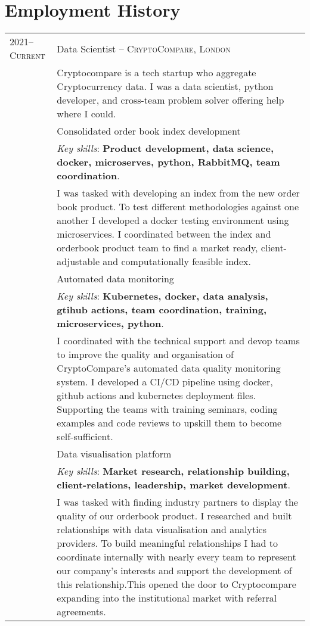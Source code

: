 \documentclass[a4paper,10pt]{article}
\newcommand{\tab}{\hspace{10 pt}}
\begin{document}
\section{Employment History}
\begin{tabular}{p{2.25cm}|p{15cm}}
%
%	
	\textsc{2021--Current} & Data Scientist -- \textsc{CryptoCompare, London}\\
	 & \footnotesize{Cryptocompare is a tech startup who aggregate Cryptocurrency data. I was a data scientist, python developer, and cross-team problem solver offering help where I could.}\\
	 & \tab Consolidated order book index development\\
	 & \footnotesize{\emph{Key skills}: \textbf{Product development, data science, docker, microserves, python, RabbitMQ, team coordination}.}\\
	 & \footnotesize{I was tasked with developing an index from the new order book product. To test different methodologies against one another I developed a docker testing environment using microservices. I coordinated between the index and orderbook product team to find a market ready, client-adjustable and computationally feasible index.} \vspace{0.05 in}\\
	 & \tab Automated data monitoring\\
	 & \footnotesize{\emph{Key skills}: \textbf{Kubernetes, docker, data analysis, gtihub actions, team coordination, training, microservices, python}.}\\
	 & \footnotesize{I coordinated with the technical support and devop teams to improve the quality and organisation of CryptoCompare’s automated data quality monitoring system. I developed a CI/CD pipeline using docker, github actions and kubernetes deployment files. Supporting the teams with training seminars, coding examples and code reviews to upskill them to become self-sufficient.} \vspace{0.05 in}\\	 
	 & \tab Data visualisation platform\\
	 & \footnotesize{\emph{Key skills}: \textbf{Market research, relationship building, client-relations, leadership, market development}.}\\
	 & \footnotesize{I was tasked with finding industry partners to display the quality of our orderbook product. I researched and built relationships with data visualisation and analytics providers. To build meaningful relationships I had to coordinate internally with nearly every team to represent our company's interests and support the development of this relationship.This opened the door to Cryptocompare expanding into the institutional market with referral agreements.} \vspace{0.05 in}\\	

\end{tabular}
\end{document}
